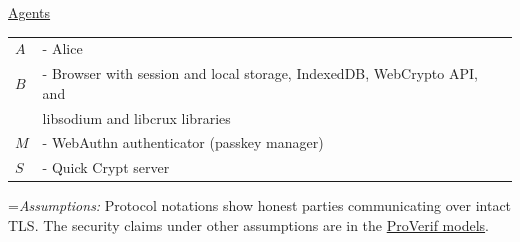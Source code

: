 \documentclass{article}
\newlength{\stanzagap}
\newlength{\notegap}
\newlength{\stanzawidth}
\newlength{\stanzabox}
\newenvironment{stanza}[1][\stanzawidth]
  {\par\addvspace{\stanzagap}%
   \setlength{\stanzabox}{\dimexpr\linewidth-\parindent\relax}%
   \ifdim\stanzabox>#1\setlength{\stanzabox}{#1}\fi
   \noindent\hspace*{\parindent}\begin{minipage}{\stanzabox}}
  {\end{minipage}\par\addvspace{\stanzagap}}
\begin{document}
\begin{stanza}
\underline{Agents}\\

\begin{tabular}{@{}p{5mm} l}
$A$ & \textrm{ - Alice} \\
$B$ & \textrm{ - Browser with session and local storage, IndexedDB, WebCrypto API, and} \\
& \phantom{\textrm{ - }}\textrm{libsodium and libcrux libraries} \\
$M$ & \textrm{ - WebAuthn authenticator (passkey manager)} \\
$S$ & \textrm{ - Quick Crypt server} \\
\end{tabular}

\vspace{\notegap}

{\leftskip=\parindent\noindent\textit{Assumptions:} Protocol notations show honest parties communicating over intact TLS. The security claims under other assumptions are in the \href{https://github.com/bschick/qcrypt/tree/main/formal/proverif}{ProVerif models}.\par}
\end{stanza}

\end{document}
